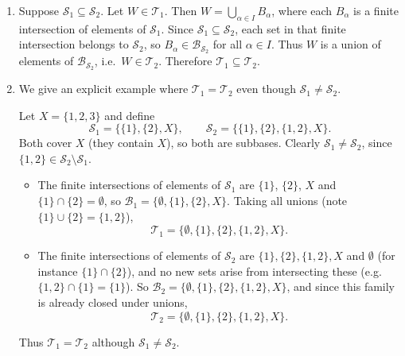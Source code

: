 \documentclass[12pt]{article}
\begin{document}
\begin{enumerate}
    \item[(i)] Suppose $\mathcal{S}_1 \subseteq \mathcal{S}_2$. Let $W \in \mathcal{T}_1$. Then $W = \bigcup_{\alpha \in I} B_\alpha$, where each $B_\alpha$ is a finite intersection of elements of $\mathcal{S}_1$. Since $\mathcal{S}_1 \subseteq \mathcal{S}_2$, each set in that finite intersection belongs to $\mathcal{S}_2$, so $B_\alpha \in \mathcal{B}_{\mathcal{S}_2}$ for all $\alpha \in I$. Thus $W$ is a union of elements of $\mathcal{B}_{\mathcal{S}_2}$, i.e.\ $W \in \mathcal{T}_2$. Therefore $\mathcal{T}_1 \subseteq \mathcal{T}_2$.

    \item[(ii)] We give an explicit example where $\mathcal{T}_1 = \mathcal{T}_2$ even though $\mathcal{S}_1 \neq \mathcal{S}_2$.

    Let $X = \{1, 2, 3\}$ and define
    \[
    \mathcal{S}_1 = \bigl\{\{1\}, \{2\}, X\bigr\}, \qquad \mathcal{S}_2 = \bigl\{\{1\}, \{2\}, \{1, 2\}, X\bigr\}.
    \]
    Both cover $X$ (they contain $X$), so both are subbases. Clearly $\mathcal{S}_1 \neq \mathcal{S}_2$, since $\{1, 2\} \in \mathcal{S}_2 \setminus \mathcal{S}_1$.

    \begin{itemize}
        \item The finite intersections of elements of $\mathcal{S}_1$ are $\{1\}$, $\{2\}$, $X$ and $\{1\}\cap\{2\}=\emptyset$, so $\mathcal{B}_1 = \{\emptyset, \{1\}, \{2\}, X\}$. Taking all unions (note $\{1\}\cup\{2\}=\{1,2\}$),
        \[
        \mathcal{T}_1 = \{\emptyset, \{1\}, \{2\}, \{1, 2\}, X\}.
        \]
        \item The finite intersections of elements of $\mathcal{S}_2$ are $\{1\},\{2\},\{1,2\},X$ and $\emptyset$ (for instance $\{1\}\cap\{2\}$), and no new sets arise from intersecting these (e.g.\ $\{1,2\}\cap\{1\}=\{1\}$). So $\mathcal{B}_2 = \{\emptyset, \{1\}, \{2\}, \{1,2\}, X\}$, and since this family is already closed under unions,
        \[
        \mathcal{T}_2 = \{\emptyset, \{1\}, \{2\}, \{1, 2\}, X\}.
        \]
    \end{itemize}
    Thus $\mathcal{T}_1 = \mathcal{T}_2$ although $\mathcal{S}_1 \neq \mathcal{S}_2$.
\end{enumerate}
\end{document}
